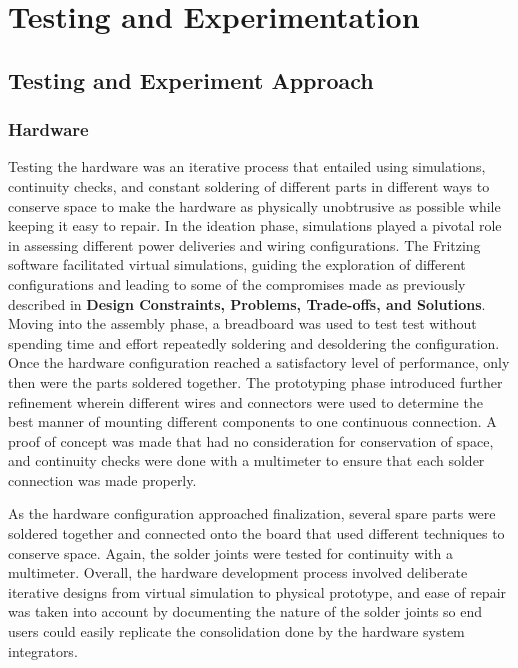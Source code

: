 \section{Testing and Experimentation}\label{sec:testing-and-experimentation}

\subsection{Testing and Experiment Approach}\label{subsec:testing-and-experiment-approach}

\subsubsection{Hardware}

Testing the hardware was an iterative process that entailed using simulations, continuity
checks, and constant soldering of different parts in different ways to conserve space to make
the hardware as physically unobtrusive as possible while keeping it easy to repair. In the
ideation phase, simulations played a pivotal role in assessing different power
deliveries and wiring configurations. The Fritzing software facilitated virtual simulations,
guiding the exploration of different configurations and leading to some of the compromises
made as previously described in
\textbf{Design Constraints, Problems, Trade-offs, and Solutions}. Moving into the assembly
phase, a breadboard was used to test test without spending time and effort repeatedly
soldering and desoldering the configuration. Once the hardware configuration reached a
satisfactory level of performance, only then were the parts soldered together. The prototyping
phase introduced further refinement wherein different wires and connectors were used to
determine the best manner of mounting different components to one continuous connection. A
proof of concept was made that had no consideration for conservation of space, and continuity
checks were done with a multimeter to ensure that each solder connection was made properly.

As the hardware configuration approached finalization, several spare parts were soldered
together and connected onto the board that used different techniques to conserve space. Again,
the solder joints were tested for continuity with a multimeter. Overall, the hardware
development process involved deliberate iterative designs from virtual simulation to physical
prototype, and ease of repair was taken into account by documenting the nature of the solder
joints so end users could easily replicate the consolidation done by the hardware system
integrators.

